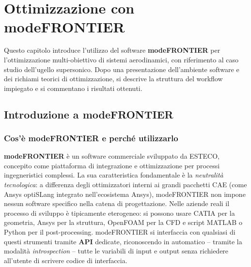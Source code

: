 
\chapter{Ottimizzazione con modeFRONTIER}
\label{cap:ottimizzazione}

Questo capitolo introduce l'utilizzo del software \textbf{modeFRONTIER}
per l'ottimizzazione multi-obiettivo di sistemi aerodinamici, con
riferimento al caso studio dell'ugello supersonico.
Dopo una presentazione dell'ambiente software e dei richiami teorici di
ottimizzazione, si descrive la struttura del workflow impiegato e si
commentano i risultati ottenuti.

\section{Introduzione a modeFRONTIER}

\subsection{Cos'è modeFRONTIER e perché utilizzarlo}

\textbf{modeFRONTIER} è un software commerciale sviluppato da ESTECO,
concepito come piattaforma di integrazione e ottimizzazione per processi
ingegneristici complessi.
La sua caratteristica fondamentale è la \textit{neutralità tecnologica}:
a differenza degli ottimizzatori interni ai grandi pacchetti CAE (come
Ansys optiSLang integrato nell'ecosistema Ansys), modeFRONTIER non impone
nessun software specifico nella catena di progettazione.
Nelle aziende reali il processo di sviluppo è tipicamente eterogeneo:
si possono usare CATIA per la geometria, Ansys per la struttura,
OpenFOAM per la CFD e script MATLAB o Python per il post-processing.
modeFRONTIER si interfaccia con qualsiasi di questi strumenti tramite
\textbf{API} dedicate, riconoscendo in automatico -- tramite la modalità
\textit{introspection} -- tutte le variabili di input e output senza
richiedere all'utente di scrivere codice di interfaccia.

